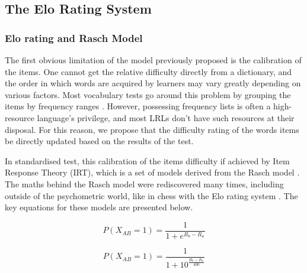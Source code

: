     \subsection{The Elo Rating System}
        \subsubsection{Elo rating and Rasch Model}
The first obvious limitation of the model previously proposed is the calibration of the items. One cannot get the relative difficulty directly from a dictionary, and the order in which words are acquired by learners may vary greatly depending on various factors. Most vocabulary tests go around this problem by grouping the items by frequency ranges \parencite{nation_teaching_1990, meara_complexities_1994, dudley_context-aligned_2024}. However, possessing frequency lists is often a high-resource language's privilege, and most LRLs don't have such resources at their disposal. For this reason, we propose that the difficulty rating of the words items be directly updated based on the results of the test.

In standardised test, this calibration of the items difficulty if achieved by Item Response Theory (IRT), which is a set of models derived from the Rasch model \parencite{rasch_probabilistic_1980}. The maths behind the Rasch model were rediscovered many times, including outside of the psychometric world, like in chess with the Elo rating system \parencite{elo_uscf_1961, elo_rating_1986}. The key equations for these models are presented below.

\begin{figure}[h]
    \centering
    \begin{minipage}{0.45\textwidth}
        \centering
            $$P(X_{AB} = 1)=\frac{1}{1+e^{R_b-R_a}}$$
    \end{minipage}
    \hfill
    \begin{minipage}{0.45\textwidth}
        \centering
            $$P(X_{AB} = 1)=\frac{1}{1+10^{\frac{R_b-R_a}{400}}}$$
        \label{Elo}
    \end{minipage}
\end{figure}

